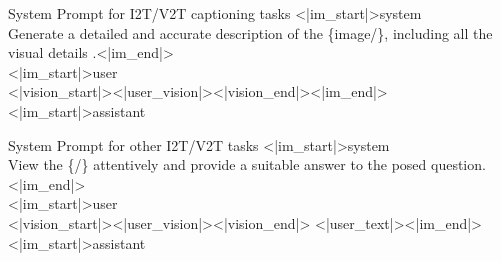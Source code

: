 \begin{minipage}{\textwidth}
\centering
\small
\setlength{\parskip}{0pt}

\begin{promptfigbox}{System Prompt for I2T/V2T captioning tasks}
{\ttfamily
\textless|im\_start|\textgreater system\\[1pt]
Generate a detailed and accurate description of the \{{\color{blue}image}/{\color{orange}{video}}\}, including all the visual details {}.\textless|im\_end|\textgreater\\[1pt]
\textless|im\_start|\textgreater user\\[1pt]
\textless|vision\_start|\textgreater {{\color{red}\textless|user\_vision|\textgreater}}\textless|vision\_end|\textgreater\textless|im\_end|\textgreater\\[1pt]
\textless|im\_start|\textgreater assistant
}
\end{promptfigbox}

\vspace{-0.3em}

\begin{promptfigbox}{System Prompt for other I2T/V2T tasks}
{\ttfamily
\textless|im\_start|\textgreater system\\[1pt]
View the \{{\color{blue}{image}}/{\color{orange}{video}}\} attentively and provide a suitable answer to the posed question.\textless|im\_end|\textgreater\\[1pt]
\textless|im\_start|\textgreater user\\[1pt]
\textless|vision\_start|\textgreater {{\color{red}\textless|user\_vision|\textgreater}}\textless|vision\_end|\textgreater
{{\color{red}\textless|user\_text|\textgreater}}\textless|im\_end|\textgreater\\[1pt]
\textless|im\_start|\textgreater assistant
}
\end{promptfigbox}

\vspace{-0.5em}

\label{fig:prompt-und}

\end{minipage}



